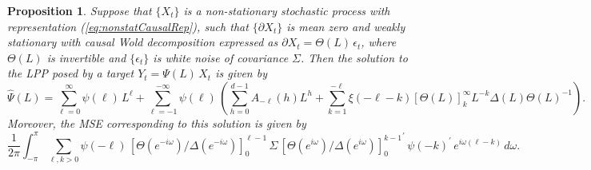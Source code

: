 \documentclass[a4paper]{book}
\newtheorem{Proposition}{Proposition}
\begin{document}
\begin{Proposition}
 \label{prop:GPP-nonstat}
 Suppose that $\{ X_t \}$ is  a non-stationary stochastic process
 with representation (\ref{eq:nonstatCausalRep}), such that
 $\{ \partial X_t \}$ is mean zero and weakly stationary 
 with  causal Wold decomposition expressed as $\partial X_t = \Theta (L) \, \epsilon_t$,
 where $\Theta (L)$ is invertible and
  $\{ \epsilon_t \}$ is white noise of covariance $\Sigma$.
  Then the solution
 to the LPP posed by a   target $Y_t = \Psi (L) \, X_t$ is given by
\begin{equation}
 \label{eq:GPPsoln-nonstat}
  \widehat{\Psi} (L) = \sum_{\ell = 0}^{\infty} \psi (\ell) \, L^{\ell}
    + \sum_{ \ell = -1}^{- \infty} \psi (\ell) \, 
\left(  \sum_{h=0 }^{d-1} A_{-\ell} (h) L^{h} + \sum_{k=1}^{-\ell} \xi (-\ell-k)
  { [  \Theta (L) ] }_{k}^{\infty} L^{-k} \Delta (L) { \Theta (L)}^{-1} 
 \right).
\end{equation}
 Moreover, the   MSE  corresponding to this solution is given by
\begin{equation} 
\label{eq:minimalMSE}
 \frac{1}{ 2 \pi} \int_{-\pi}^{\pi}   \sum_{\ell, k > 0 } \psi (-\ell) \,
  {[ \Theta  (e^{-i \omega}) / \Delta (e^{-i \omega}) ]}_0^{\ell-1}   \,  \Sigma \,
  { {[ \Theta  (e^{i \omega}) / \Delta (e^{i \omega}) ]}_0^{ k-1} }^{\prime}  \,
   {\psi (-k) }^{\prime} \,  e^{i \omega (\ell - k) }   \, d\omega.
\end{equation}
 \end{Proposition}
 
\end{document}
